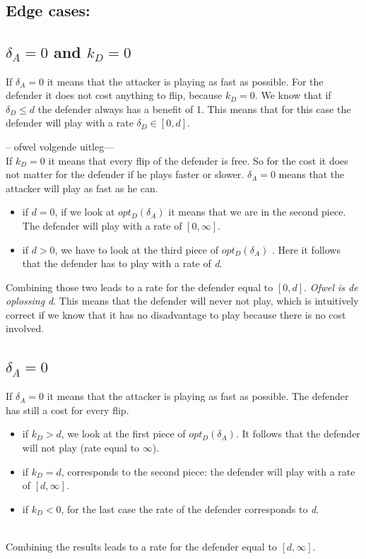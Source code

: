 ~~\\


\subsection*{Edge cases:}

\subsection*{$\delta_{A}=0$ and $k_{D}=0$}
If $\delta_{A}=0$ it means that the attacker is playing as fast as possible. For the defender it does not cost anything to flip, because $k_{D}=0$. We know that if $\delta_{D} \leq d$ the defender always has a benefit of 1. This means that for this case the defender will play with a rate $\delta_{D} \in [0,d]$.

-- ofwel volgende uitleg--- \\
If $k_{D}=0$ it means that every flip of the defender is free. So for the cost it does not matter for the defender if he plays faster or slower. $\delta_{A}=0$ means that the attacker will play as fast as he can.  
\begin{itemize}
\item if $d=0$, if we look at $opt_{D}(\delta_{A})$ it means that we are in the second piece. The defender will play with a rate of $[0,\infty]$. 
\item if $d >0$, we have to look at the third piece of  $opt_{D}(\delta_{A})$ . Here it follows that the defender has to play with a rate of \textit{d}.
\end{itemize}

Combining those two leads to a rate for the defender equal to $[0,d]$.  \textit{Ofwel is de oplossing d}. This means that the defender will never not play, which is intuitively correct if we know that it has no disadvantage to play because there is no cost involved.
\subsection*{$\delta_{A}=0$}
If $\delta_{A}=0$ it means that the attacker is playing as fast as possible. The defender has still a cost for every flip.
\begin{itemize}
\item if $k_{D} > d$, we look at the first piece of $opt_{D}(\delta_{A})$. It follows that the defender will not play (rate equal to $\infty$).
\item if $k_{D}=d$, corresponds to the second piece: the defender will play with a rate of $[d,\infty]$.
\item if $k_{D} < 0$, for the last case the rate of the defender corresponds to \textit{d}.
\end{itemize}
~~\\
Combining the results leads to a rate for the defender equal to $[d,\infty]$. 

